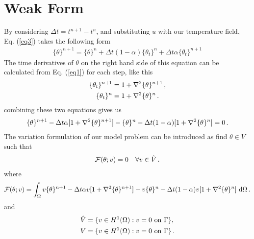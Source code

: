 \documentclass[]{article}
\begin{document}
\section{Weak Form} \label{sec: WF}
By considering $\Delta t = t^{n+1} - t^{n}$, and substituting $u$ with our temperature field, Eq. (\ref{eq3})  takes the following form
\begin{equation}\label{eq4}
	\begin{aligned}
	\{\theta\}^{n+1} = \{\theta\}^n + \Delta t(1 - \alpha)\{\theta_t\}^n + \Delta t\alpha\{\theta_t\}^{n+1}
	\end{aligned}
\end{equation}
The time derivatives of $\theta$ on the right hand side of this equation can be calculated from Eq. (\ref{eq1}) for each step, like this 
\begin{equation}\label{eq5}
	\begin{aligned}
		\{\theta_t\}^{n+1} &= 1 + \nabla^2 \{\theta\}^{n+1}\thinspace,\\
		\{\theta_t\}^{n} &= 1 + \nabla^2 \{\theta\}^{n}\thinspace. \\
	\end{aligned}
\end{equation}
combining these two equations gives us
\begin{equation}\label{eq6}
	\begin{aligned}
		\{\theta\}^{n+1} -\Delta t\alpha[1 + \nabla^2 \{\theta\}^{n+1}] - \{\theta\}^n - \Delta t(1 - \alpha)[1 + \nabla^2 \{\theta\}^{n}]=0\thinspace .
	\end{aligned}
\end{equation}
The variation formulation of our model problem can be introduced as find $\theta \in V$ such that
\begin{equation}\label{eq7}
	\begin{aligned}
		\mathcal{F}(\theta;v) = 0 \quad \forall v \in \hat{V}\thinspace.
	\end{aligned}
\end{equation}
where
\begin{equation}\label{eq8}
	\begin{aligned}
		\mathcal{F}(\theta; v) =\int_{\Omega} v\{\theta\}^{n+1} -\Delta t\alpha v[1+\nabla^2\{ \theta\}^{n+1}] - v\{\theta\}^n - \Delta t(1 - \alpha)v[1+\nabla^2\{\theta\}^{n}]\ \mathrm{d}\Omega \thinspace .
	\end{aligned}
\end{equation}
and
\begin{equation}\label{eq9}
	\begin{aligned}
		\hat{V} &= \{v \in H^1(\Omega) : v = 0 \text{ on } \Gamma\}, \\
		V &= \{v \in H^1(\Omega) : v = 0 \text{ on } \Gamma\}\thinspace.
	\end{aligned}
\end{equation}
\end{document}
